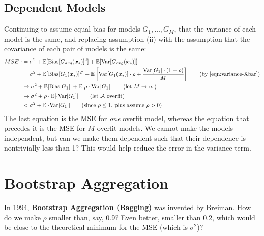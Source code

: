 \documentclass[12pt, a4paper]{article}
\theoremstyle{definition}
\begin{document}
	\subsection*{Dependent Models}
	Continuing to assume equal bias for models $G_1,\ldots,G_M$, that
	the variance of each model is the same, and replacing assumption (ii)
	with the assumption that
	the covariance of each pair of models is the same:
	\begin{align*}
		MSE :
		&=\sigma^2 + \mathbb{E}[\text{Bias}[G_{avg}(\bm{x}_*)]^2]
		+\mathbb{E}[\text{Var}[G_{avg}(\bm{x}_{*})]]\\
		&=\sigma^2 + \mathbb{E}[\text{Bias}[G_{1}(\bm{x}_*)]^2]
		+\mathbb{E}\left[\text{Var}[G_{1}(\bm{x}_{*})]\cdot \rho +
		\frac{\text{Var}[G_1]\cdot (1-\rho)}{M}
		 \right]
		 \tag{by \ref{eqn:variance-Xbar}}\\
 		&\to\sigma^2 + \mathbb{E}[\text{Bias}[G_1]] +
 		\mathbb{E}[\rho \cdot \text{Var}[G_1]]
 		\tag{let $M\to\infty$}\\
 		&\to\sigma^2+\rho \cdot \mathbb{E}[\cdot \text{Var}[G_1]]
 		\tag{let $\mathcal{A}$ overfit}\\
 		&<\sigma^2 + \mathbb{E}[\cdot \text{Var}[G_1]]
 		\tag{since $\rho \leq 1$, plus assume $\rho>0$}
	\end{align*}
	The last equation is the MSE for \textit{one} overfit model, whereas
	the equation that precedes it is the MSE for $M$ overfit models.
	We cannot make the models independent, but can we make them dependent
	such that their dependence is nontrivially less than 1? This would
	help reduce the error in the variance term.
	\section*{Bootstrap Aggregation}
	In 1994, \textbf{Bootstrap Aggregation (Bagging)} was invented by
	Breiman. How do we make $\rho$ smaller than, say, 0.9? Even better,
	smaller than 0.2, which would be close to the theoretical minimum
	for the MSE (which is $\sigma^2$)?
	
\end{document}

